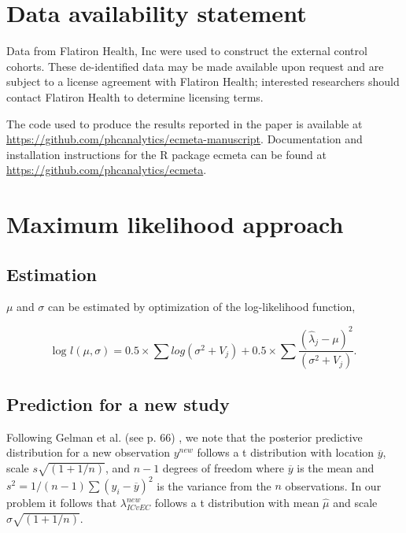 \documentclass[11pt,final,fleqn]{article}\usepackage[]{graphicx}\usepackage[]{color}
\newcommand{\pkg}[1]{{\fontseries{m}\fontseries{b}\selectfont #1}}
\begin{document}



\section*{Data availability statement}
Data from Flatiron Health, Inc were used to construct the external control cohorts. These de-identified data may be made available upon request and are subject to a license agreement with Flatiron Health; interested researchers should contact Flatiron Health to determine licensing terms. 

The code used to produce the results reported in the paper is available at \url{https://github.com/phcanalytics/ecmeta-manuscript}. Documentation and installation instructions for the \textsf{R} package \pkg{ecmeta} can be found at \url{https://github.com/phcanalytics/ecmeta}. 


\appendix
\renewcommand\thefigure{\thesection.\arabic{figure}}    
\setcounter{figure}{0} 

\section{Maximum likelihood approach} \label{appendix:ml}
\subsection{Estimation}
$\mu$ and $\sigma$ can be estimated by optimization of the log-likelihood function,

\begin{equation}
\text{log } l(\mu,\sigma) = 0.5 \times \sum{log(\sigma^2+V_j)} +
0.5 \times \sum{ \frac{(\hat\lambda_j-\mu)^2}{(\sigma^2+V_j)} }.
\end{equation}

\subsection{Prediction for a new study}
Following Gelman et al. (see p. 66) \cite{gelman2013bayesian}, we note that the posterior predictive distribution for a new observation $y^{new}$ follows a t distribution with location $\overline{y}$, scale $s\sqrt{(1 + 1/n)}$, and $n-1$ degrees of freedom where $\overline{y}$ is the mean and $s^2=1/(n-1)\sum (y_i - \overline{y})^2$ is the variance from the $n$ observations. In our problem it follows that $\lambda_{ICvEC}^{new}$ follows a t distribution with mean $\hat{\mu}$ and scale $\hat{\sigma}\sqrt{(1 + 1/n)}$.
\end{document}
